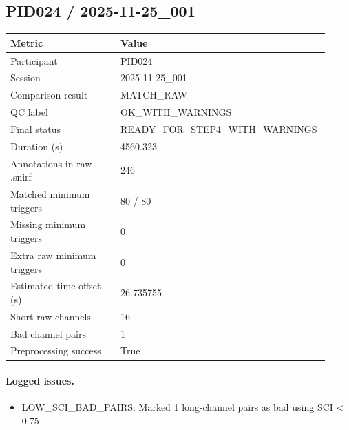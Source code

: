\subsection*{PID024 / 2025-11-25\_001}
\begin{tabular}{p{0.34\linewidth}p{0.58\linewidth}}
\toprule
Metric & Value\\
\midrule
Participant & PID024\\
Session & 2025-11-25\_001\\
Comparison result & MATCH\_RAW\\
QC label & OK\_WITH\_WARNINGS\\
Final status & READY\_FOR\_STEP4\_WITH\_WARNINGS\\
Duration (s) & 4560.323\\
Annotations in raw .snirf & 246\\
Matched minimum triggers & 80 / 80\\
Missing minimum triggers & 0\\
Extra raw minimum triggers & 0\\
Estimated time offset (s) & 26.735755\\
Short raw channels & 16\\
Bad channel pairs & 1\\
Preprocessing success & True\\
\bottomrule
\end{tabular}
\paragraph{Logged issues.}
\begin{itemize}
\item [WARNING] LOW\_SCI\_BAD\_PAIRS: Marked 1 long-channel pairs as bad using SCI < 0.75
\end{itemize}
